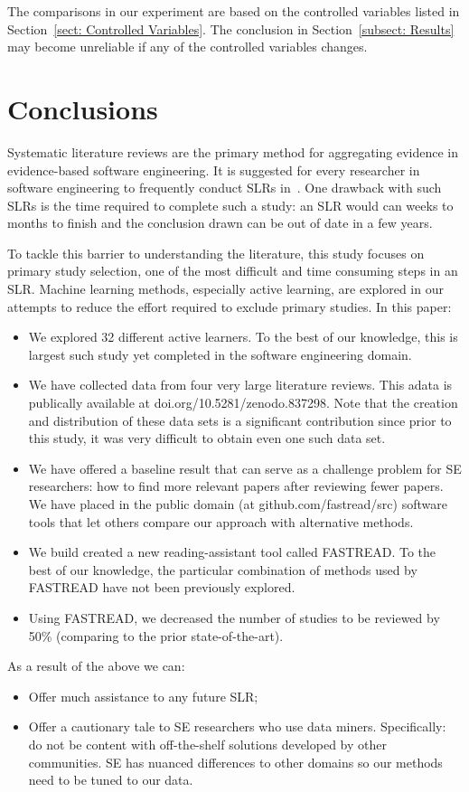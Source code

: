 \documentclass{svjour3}
\theoremstyle{break}
\begin{document}
The comparisons in our experiment are based on the controlled variables listed in Section~\ref{sect: Controlled Variables}. The conclusion in Section~\ref{subsect: Results} may become unreliable if any of the controlled variables changes.



\section{Conclusions}\label{sect: Conclusion}

Systematic literature reviews are the primary method for aggregating evidence in evidence-based software engineering. It is suggested for every researcher in software engineering to frequently conduct SLRs in~\cite{keele2007guidelines}.
One drawback with such SLRs is the time
required to complete such a study:
  an SLR would can weeks to  months to finish and the conclusion drawn can be out of date in a few years. 
  
  To tackle this barrier to understanding the literature, this study focuses on primary study selection, one of the most difficult and time consuming steps in an SLR. Machine learning methods, especially active learning, are explored in our attempts to reduce the effort required to exclude primary studies. In this paper:
  
\begin{itemize}
\item
We explored 32 different active learners. To the best of our knowledge, this is largest
such study yet completed in the software engineering domain. 
\item
We  have collected data from four very large literature reviews. This adata is publically available at
doi.org/10.5281/zenodo.837298. Note that the creation and distribution of these data sets is a significant contribution since prior to this study, it was  very difficult to obtain even one such data set. 
\item
We have offered a baseline result that can serve
as a challenge problem for SE researchers: how to find more relevant
papers after reviewing fewer  papers. 
We  have  placed in the public domain (at github.com/fastread/src) software
tools that let others compare our approach with alternative methods.
\item
We build created a new reading-assistant tool called FASTREAD.
To the best of our knowledge, the particular combination of methods used by FASTREAD have not been previously explored.
\item
Using FASTREAD, we decreased the number of studies to be reviewed by 50\% (comparing to the prior state-of-the-art).
\end{itemize}
\newpage
\noindent
As a result  of the above we can:
\begin{itemize}
\item Offer much assistance to any future SLR;
\item Offer a cautionary tale to SE 
researchers who use data miners. Specifically: do not be content with off-the-shelf solutions developed
by other communities. SE   has nuanced differences to other domains so our methods need to be tuned to our data.
\end{itemize}
\end{document}
